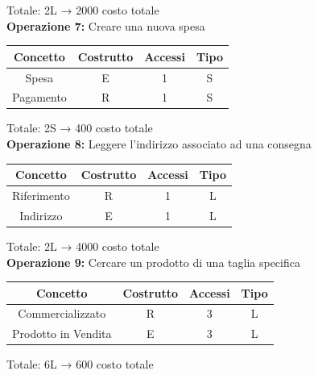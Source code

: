 \documentclass[a4paper,12pt]{report}
\begin{document}
Totale: 2L → 2000 costo totale\\
\textbf{Operazione 7:}
Creare una nuova spesa\\
\begin{center}
    \begin{tabular}{ | c   c   c   c | } 
    \hline
	Concetto&Costrutto&Accessi&Tipo\\
	\hline
	Spesa&E&1&S\\
	\hline
	Pagamento&R&1&S\\
	\hline
	\end{tabular}
\end{center}
Totale: 2S → 400 costo totale\\
\textbf{Operazione 8:}
Leggere l'indirizzo associato ad una consegna\\
\begin{center}
    \begin{tabular}{ | c   c   c   c | } 
    \hline
	Concetto&Costrutto&Accessi&Tipo\\
	\hline
	Riferimento&R&1&L\\
	\hline
    Indirizzo&E&1&L\\
	\hline
	\end{tabular}
\end{center}
Totale: 2L → 4000 costo totale\\
\textbf{Operazione 9:}
Cercare un prodotto di una taglia specifica\\
\begin{center}
    \begin{tabular}{ | c   c   c   c | } 
    \hline
	Concetto&Costrutto&Accessi&Tipo\\
	\hline
	Commercializzato&R&3&L\\
	\hline
    Prodotto in Vendita&E&3&L\\
	\hline
	\end{tabular}
\end{center}
Totale: 6L → 600 costo totale\\
\end{document}
